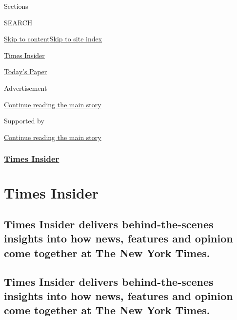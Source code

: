Sections

SEARCH

\protect\hyperlink{site-content}{Skip to
content}\protect\hyperlink{site-index}{Skip to site index}

\href{https://www.nytimes.com/series/times-insider}{Times Insider}

\href{https://myaccount.nytimes.com/auth/login?response_type=cookie\&client_id=vi}{}

\href{https://www.nytimes.com/section/todayspaper}{Today's Paper}

Advertisement

\protect\hyperlink{after-top}{Continue reading the main story}

Supported by

\protect\hyperlink{after-sponsor}{Continue reading the main story}

\hypertarget{times-insider}{%
\subsubsection{\texorpdfstring{\href{/section/insider}{Times
Insider}}{Times Insider}}\label{times-insider}}

\hypertarget{times-insider-1}{%
\section{Times Insider}\label{times-insider-1}}

\hypertarget{times-insider-delivers-behind-the-scenes-insights-into-how-news-features-and-opinion-come-together-at-the-new-york-times}{%
\subsection{Times Insider delivers behind-the-scenes insights into how
news, features and opinion come together at The New York
Times.}\label{times-insider-delivers-behind-the-scenes-insights-into-how-news-features-and-opinion-come-together-at-the-new-york-times}}

\hypertarget{times-insider-delivers-behind-the-scenes-insights-into-how-news-features-and-opinion-come-together-at-the-new-york-times-1}{%
\subsection{Times Insider delivers behind-the-scenes insights into how
news, features and opinion come together at The New York
Times.}\label{times-insider-delivers-behind-the-scenes-insights-into-how-news-features-and-opinion-come-together-at-the-new-york-times-1}}

